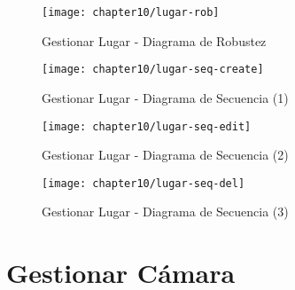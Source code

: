     \begin{figure}[H]
        \centering
        \texttt{[image: chapter10/lugar-rob]}
        \caption{Gestionar Lugar - Diagrama de Robustez}
        \label{fig:lugar-rob}
    \end{figure}
    
    \begin{figure}[H]
        \centering
        \texttt{[image: chapter10/lugar-seq-create]}
        \caption{Gestionar Lugar - Diagrama de Secuencia (1) }
        \label{fig:lugar-seq-create}
    \end{figure}
    
    \begin{figure}[H]
        \centering
        \texttt{[image: chapter10/lugar-seq-edit]}
        \caption{Gestionar Lugar - Diagrama de Secuencia (2) }
        \label{fig:lugar-seq-edit}
    \end{figure}
    
    \begin{figure}[H]
        \centering
        \texttt{[image: chapter10/lugar-seq-del]}
        \caption{Gestionar Lugar - Diagrama de Secuencia (3) }
        \label{fig:lugar-seq-del}
    \end{figure}

\section{Gestionar Cámara}

